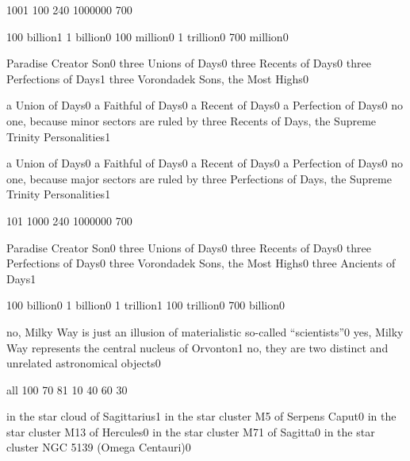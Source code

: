 {100}{1}
{10}{0}
{24}{0}
{100000}{0}
{70}{0}
\qstop

{100 billion}{1}
{1 billion}{0}
{100 million}{0}
{1 trillion}{0}
{700 million}{0}
\qstop

{Paradise Creator Son}{0}
{three Unions of Days}{0}
{three Recents of Days}{0}
{three Perfections of Days}{1}
{three Vorondadek Sons, the Most Highs}{0}
\qstop

{a Union of Days}{0}
{a Faithful of Days}{0}
{a Recent of Days}{0}
{a Perfection of Days}{0}
{no one, because minor sectors are ruled by three Recents of Days, the Supreme Trinity Personalities}{1}
\qstop

{a Union of Days}{0}
{a Faithful of Days}{0}
{a Recent of Days}{0}
{a Perfection of Days}{0}
{no one, because major sectors are ruled by three Perfections of Days, the Supreme Trinity Personalities}{1}
\qstop

{10}{1}
{100}{0}
{24}{0}
{100000}{0}
{70}{0}
\qstop

{Paradise Creator Son}{0}
{three Unions of Days}{0}
{three Recents of Days}{0}
{three Perfections of Days}{0}
{three Vorondadek Sons, the Most Highs}{0}
{three Ancients of Days}{1}
\qstop

{100 billion}{0}
{1 billion}{0}
{1 trillion}{1}
{100 trillion}{0}
{700 billion}{0}
\qstop

{no, Milky Way is just an illusion of materialistic so-called ``scientists''}{0}
{yes, Milky Way represents the central nucleus of Orvonton}{1}
{no, they are two distinct and unrelated astronomical objects}{0}
\qstop

{all 10}{0}
{7}{0}
{8}{1}
{1}{0}
{4}{0}
{6}{0}
{3}{0}
\qstop

{in the star cloud of Sagittarius}{1}
{in the star cluster M5 of Serpens Caput}{0}
{in the star cluster M13 of Hercules}{0}
{in the star cluster M71 of Sagitta}{0}
{in the star cluster NGC 5139 (Omega Centauri)}{0}
\qstop


